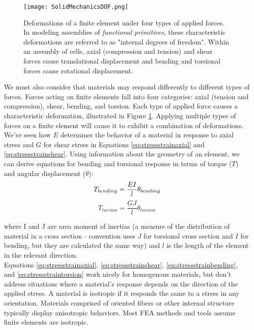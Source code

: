 {\begin{figure}
  \texttt{[image: SolidMechanicsDOF.png]}
  \caption{Deformations of a finite element under four types of applied forces.  In modeling assemblies of \textit{functional primitives}, these characteristic deformations are referred to as "internal degrees of freedom".  Within an assembly of cells, axial (compression and tension) and shear forces cause translational displacement and bending and torsional forces cause rotational displacement.}
  \label{fig:SolidMechanicsDOF}
\end{figure}

We must also consider that materials may respond differently to different types of forces.  Forces acting on finite elements fall into four categories: axial (tension and compression), shear, bending, and torsion.  Each type of applied force causes a characteristic deformation, illustrated in Figure \ref{fig:SolidMechanicsDOF}.  Applying multiple types of forces on a finite element will cause it to exhibit a combination of deformations.  We've seen how $E$ determines the behavior of a material in response to axial stress and $G$ for shear stress in Equations \ref{eq:stressstrainaxial} and  \ref{eq:stressstrainshear}.  Using information about the geometry of an element, we can derive equations for bending and torsional response in terms of torque ($T$) and angular displacement ($\theta$):
\begin{equation}\label{eq:stressstrainbending}
T_{bending} = \dfrac{EI}{l}\theta_{bending}\\[10pt]
\end{equation}
\begin{equation}\label{eq:stressstraintorsion}
T_{torsion} = \dfrac{GJ}{l}\theta_{torsion} 
\end{equation}

where I and J are area moment of inertias (a measure of the distribution of material in a cross section - convention uses $J$ for torsional cross section and $I$ for bending, but they are calculated the same way) and $l$ is the length of the element in the relevant direction.\\

Equations \ref{eq:stressstrainaxial}, \ref{eq:stressstrainshear}, \ref{eq:stressstrainbending}, and \ref{eq:stressstraintorsion} work nicely for homogenous materials, but don't address situations where a material's response depends on the direction of the applied stress.  A material is isotropic if it responds the same to a stress in any orientation.  Materials comprised of oriented fibers or other internal structure typically display anisotropic behaviors.  Most FEA methods and tools assume finite elements are isotropic.

}
